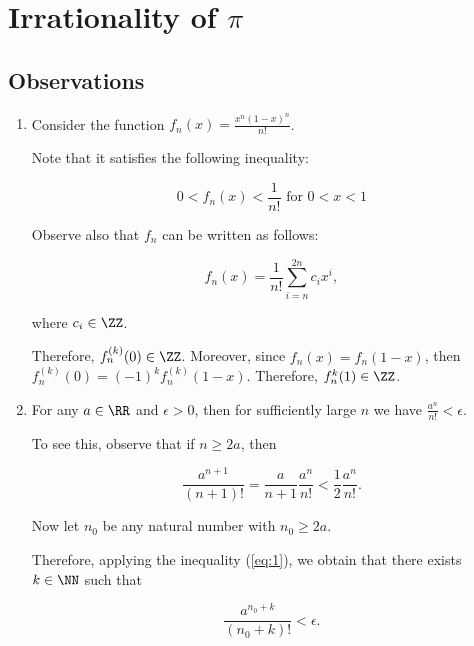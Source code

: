 \documentclass[11pt]{scrartcl}
\begin{document}
\section{Irrationality of $\pi$}

\subsection{Observations}

\begin{enumerate}
\item\label{item:1} Consider the function $f_n(x) = \frac{x^n(1-x)^n}{n!}$.

  Note that it satisfies the following inequality:


  \begin{equation*}
0 < f_n(x) < \frac{1}{n!}\text{ for $0< x < 1$}
\end{equation*}

Observe also that $f_n$ can be written as follows:

\begin{equation}
f_n(x) = \frac{1}{n!}\sum_{i=n}^{2n}c_ix^i,
\end{equation}

where $c_i \in \ZZ$.

Therefore, $f_n^{(k)}(0) \in \ZZ$. Moreover, since
$f_n(x) = f_n(1-x)$, then $f_n^{(k)}(0) =
(-1)^kf_n^{(k)}(1-x)$. Therefore, $f_n^{k}(1) \in \ZZ$.

\item For any $a \in \RR$ and $\epsilon > 0$, then for sufficiently
  large $n$ we have $\frac{a^n}{n!}< \epsilon$.

  To see this, observe that if $n\geq 2a$, then

  \begin{equation}
    \label{eq:1}
    \frac{a^{n+1}}{(n+1)!} = \frac{a}{n+1}\frac{a^n}{n!} <
    \frac{1}{2}\frac{a^n}{n!}.
  \end{equation}


  Now let $n_0$ be any natural number with $n_0\geq 2a$.

  Therefore, applying the inequality (\ref{eq:1}), we obtain that
  there exists $k\in \NN$ such that


  \begin{equation*}
    \frac{a^{n_0+k}}{(n_0+k)!}< \epsilon.
  \end{equation*}

\end{enumerate}
\end{document}
